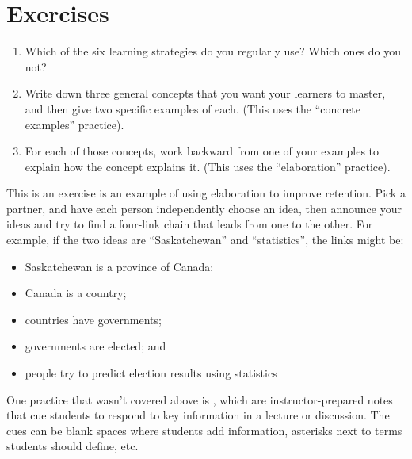 \section{Exercises}\label{s:individual-exercises}


\begin{enumerate}

\item
  Which of the six learning strategies do you regularly use? Which
  ones do you not?

\item
  Write down three general concepts that you want your learners to
  master, and then give two specific examples of each. (This uses the
  ``concrete examples'' practice).

\item
  For each of those concepts, work backward from one of your examples
  to explain how the concept explains it. (This uses the
  ``elaboration'' practice).

\end{enumerate}



This is an exercise is an example of using elaboration to improve
retention.  Pick a partner, and have each person independently choose
an idea, then announce your ideas and try to find a four-link chain
that leads from one to the other.  For example, if the two ideas are
``Saskatchewan'' and ``statistics'', the links might be:

\begin{itemize}
\item
  Saskatchewan is a province of Canada;
\item
  Canada is a country;
\item
  countries have governments;
\item
  governments are elected; and
\item
  people try to predict election results using statistics
\end{itemize}


One practice that wasn't covered above is
, which are instructor-prepared
notes that cue students to respond to key information in a lecture or
discussion.  The cues can be blank spaces where students add
information, asterisks next to terms students should define, etc.

